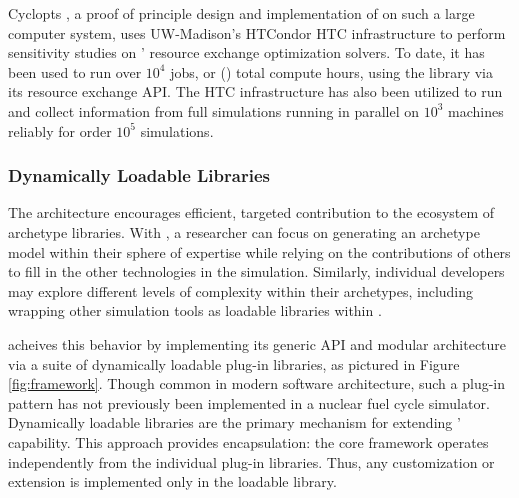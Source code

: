 Cyclopts \cite{gidden_cyclopts_2015}, a proof of principle design and
implementation of \Cyclus on such a large computer system, uses UW-Madison's
HTCondor \gls{HTC} infrastructure to perform sensitivity studies on \Cyclus'
resource exchange optimization solvers. To date, it has been used to run over
$10^4$ jobs, or () total compute hours, using the \Cyclus
library via its resource exchange \gls{API}.  The \gls{HTC} infrastructure has
also been utilized to run and collect information from full \Cyclus simulations
running in parallel on $10^3$ machines reliably for order $10^5$ simulations.

\subsubsection{Dynamically Loadable Libraries}

The \Cyclus architecture encourages efficient, targeted contribution to the ecosystem of
archetype libraries.
With \Cyclus, a researcher can focus on generating an archetype model within their
sphere of expertise while relying on the contributions of others to fill
in the other technologies in the simulation.
Similarly, individual developers may explore different levels of complexity within their archetypes, including
wrapping other simulation tools as loadable libraries within \Cyclus.

\Cyclus acheives this behavior by implementing its generic \gls{API} and
modular architecture via a suite of dynamically loadable plug-in libraries, as
pictured in Figure \ref{fig:framework}.
Though common in modern software architecture, such a plug-in pattern has not
previously been implemented in a nuclear fuel cycle simulator. Dynamically
loadable libraries are the primary mechanism for extending \Cyclus' capability.
This approach provides encapsulation: the core framework operates
independently from the individual plug-in libraries. Thus, any customization or
extension is implemented only in the loadable library.

